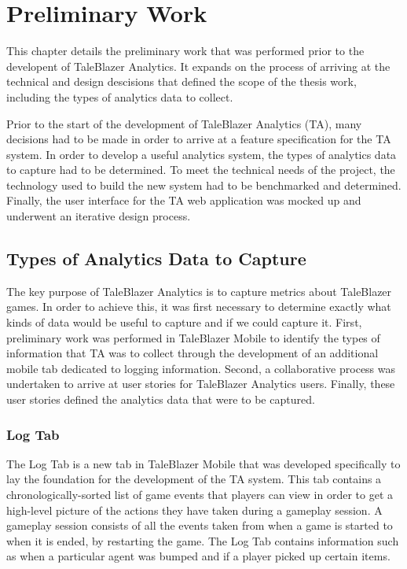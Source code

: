 \chapter{Preliminary Work}

This chapter details the preliminary work that was performed prior to the developent of TaleBlazer Analytics. It expands on the process of arriving at the technical and design descisions that defined the scope of the thesis work, including the types of analytics data to collect. 

Prior to the start of the development of TaleBlazer Analytics (TA), many decisions had to be made in order to arrive at a feature specification for the TA system. In order to develop a useful analytics system, the types of analytics data to capture had to be determined. To meet the technical needs of the project, the technology used to build the new system had to be benchmarked and determined. Finally, the user interface for the TA web application was mocked up and underwent an iterative design process.

\section{Types of Analytics Data to Capture}

The key purpose of TaleBlazer Analytics is to capture metrics about TaleBlazer games. In order to achieve this, it was first necessary to determine exactly what kinds of data would be useful to capture and if we could capture it. First, preliminary work was performed in TaleBlazer Mobile to identify the types of information that TA was to collect through the development of an additional mobile tab dedicated to logging information. Second, a collaborative process was undertaken to arrive at user stories for TaleBlazer Analytics users. Finally, these user stories defined the analytics data that were to be captured. 

\subsection{Log Tab}

The Log Tab is a new tab in TaleBlazer Mobile that was developed specifically to lay the foundation for the development of the TA system. This tab contains a chronologically-sorted list of game events that players can view in order to get a high-level picture of the actions they have taken during a gameplay session. A gameplay session consists of all the events taken from when a game is started to when it is ended, by restarting the game. The Log Tab contains information such as when a particular agent was bumped and if a player picked up certain items. 

